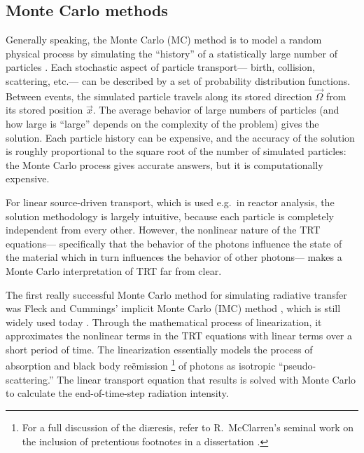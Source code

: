 \subsection{Monte Carlo methods}

Generally speaking, the Monte Carlo (MC) method is to model a random
physical process by simulating the ``history'' of a statistically large number
of particles \cite{Bro2004a}. Each stochastic aspect of particle transport---%
birth, collision, scattering, etc.---%
can be described by a set of probability distribution functions. Between
events, the simulated particle travels along its stored direction
$\vec{\Omega}$ from its stored position $\vec{x}$. The average behavior of
large numbers of particles (and how large is ``large'' depends on the
complexity of the problem) gives the solution. Each particle history can be
expensive, and the accuracy of the solution is roughly proportional to the
square root of the number of simulated particles: the Monte Carlo process
gives accurate answers, but it is computationally expensive. 

For linear source-driven transport, which is used e.g.~in reactor analysis, the
solution
methodology is largely intuitive, because each particle is
completely independent from every other. However, the nonlinear nature of the
TRT equations---%
specifically that the behavior of the photons influence the state of the
material which in turn influences the behavior of other photons---%
makes a Monte Carlo interpretation of TRT far from clear.

The first really successful Monte Carlo method for simulating radiative
transfer was Fleck and Cummings' implicit Monte Carlo (IMC) method
\cite{Fle1971,Wol2008}, which is still widely used today \cite{Urb2006}.
Through the
mathematical process of linearization, it approximates the nonlinear terms in
the TRT equations with linear terms over a short period of time. The
linearization essentially models the process of absorption and
black body re\"emission%
\footnote{For a full discussion of the di\ae resis, refer to R.~McClarren's seminal
work on the inclusion of pretentious footnotes in a dissertation
\cite[p.18]{McC2007}.}%
of photons as isotropic ``pseudo-scattering.'' The linear
transport equation that results is solved with Monte Carlo to calculate the
end-of-time-step radiation intensity.

